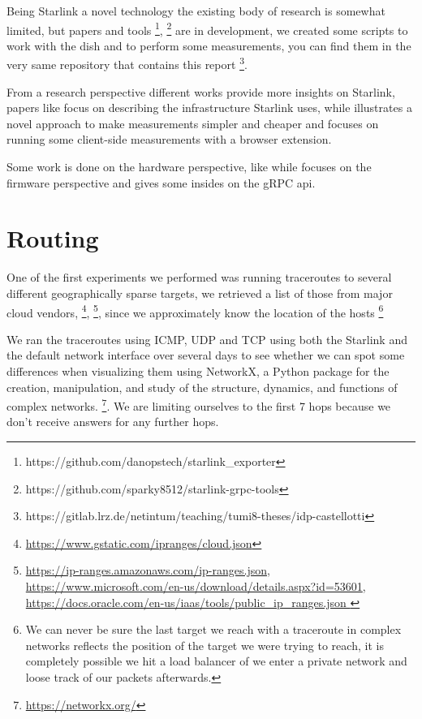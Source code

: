 \documentclass[IN,11pt,twoside,openright,bachelor,english]{tumthesis}
\begin{document}
Being Starlink a novel technology the existing body of research is somewhat limited, but papers and tools \footnote{https://github.com/danopstech/starlink\_exporter}, \footnote{https://github.com/sparky8512/starlink-grpc-tools} are in development, we created some scripts to work with the dish and to perform some measurements, you can find them in the very same repository that contains this report \footnote{https://gitlab.lrz.de/netintum/teaching/tumi8-theses/idp-castellotti}.

From a research perspective different works provide more insights on Starlink, papers like \cite{pan2023measuring} focus on describing the infrastructure Starlink uses, while \cite{izhikevich2023democratizing} illustrates a novel approach to make measurements simpler and cheaper and \cite{browser-side} focuses on running some client-side measurements with a browser extension.

Some work is done on the hardware perspective, like \cite{glitching} while \cite{quarkslab} focuses on the firmware perspective and gives some insides on the gRPC api.

\section{Routing}


One of the first experiments we performed was running traceroutes to several different geographically sparse targets, we retrieved a list of those from major cloud vendors, \footnote{\url{ https://www.gstatic.com/ipranges/cloud.json}}, \footnote{\url{https://ip-ranges.amazonaws.com/ip-ranges.json}, \url{https://www.microsoft.com/en-us/download/details.aspx?id=53601}, \url{https://docs.oracle.com/en-us/iaas/tools/public_ip_ranges.json }}, since we approximately know the location of the hosts \footnote{We can never be sure the last target we reach with a traceroute in complex networks reflects the position of the target we were trying to reach, it is completely possible we hit a load balancer of we enter a private network and loose track of our packets afterwards.}

We ran the traceroutes using ICMP, UDP and TCP using both the Starlink and the default network interface over several days to see whether we can spot some differences when visualizing them using NetworkX, a Python package for the creation, manipulation, and study of the structure, dynamics, and functions of complex networks. \footnote{\url{https://networkx.org/}}. We are limiting ourselves to the first 7 hops because we don't receive answers for any further hops. 
\end{document}
